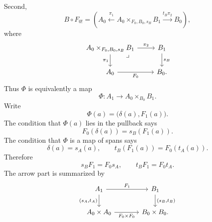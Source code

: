 Second,
\[
    B\circ F_{0!}
    =
    \left(
        A_0
        \xleftarrow{\pi_1}
        A_0\times_{F_0,B_0,s_B}B_1
        \xrightarrow{t_B\pi_2}
        B_0
    \right),
\]
where
\[
    \begin{tikzcd}
            A_0\times_{F_0,B_0,s_B}B_1
                \arrow[r, "\pi_2"]
                \arrow[d, "\pi_1"']
                \arrow[dr, phantom, "\lrcorner", very near start]
        &
            B_1 
                \arrow[d, "s_B"]
        \\
            A_0 
                \arrow[r, "F_0"']
        &
            B_0.
    \end{tikzcd}
\]
Thus \(\Phi\) is equivalently a map
\[
    \Phi:A_1\to A_0\times_{B_0}B_1.
\]
Write
\[
    \Phi(a)=\bigl(\delta(a),F_1(a)\bigr).
\]
The condition that \(\Phi(a)\) lies in the pullback says
\[
    F_0(\delta(a))=s_B(F_1(a)).
\]
The condition that \(\Phi\) is a map of spans says
\[
    \delta(a)=s_A(a),
    \qquad
    t_B(F_1(a))=F_0(t_A(a)).
\]
Therefore
\[
    s_BF_1=F_0s_A,
    \qquad
    t_BF_1=F_0t_A.
\]
The arrow part is summarized by
\[
    \begin{tikzcd}[column sep=large]
            A_1
                \arrow[r, "F_1"]
                \arrow[d, "{(s_A,t_A)}"']
        &
            B_1
                \arrow[d, "{(s_B,t_B)}"]
        \\
            A_0\times A_0
                \arrow[r, "F_0\times F_0"']
        &
            B_0\times B_0.
    \end{tikzcd}
\]

